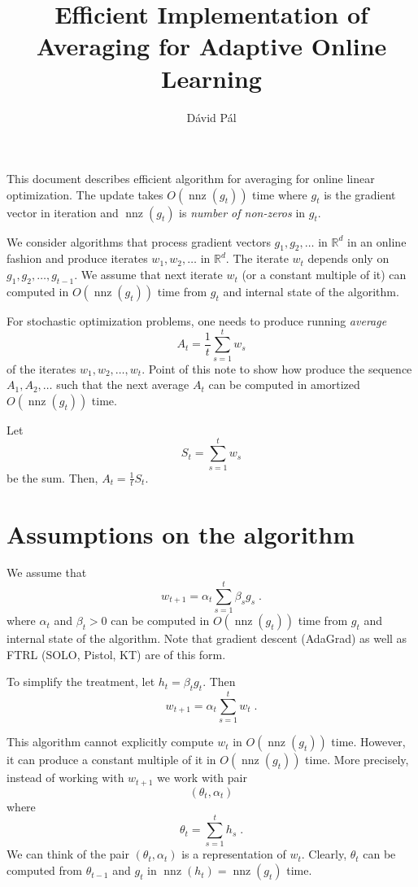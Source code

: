 \documentclass{article}
\newcommand{\R}{\mathbb{R}}
\DeclareMathOperator*{\nnz}{nnz}
\begin{document}
\title{Efficient Implementation of Averaging for Adaptive Online Learning}
\author{D\'avid P\'al}
\maketitle

This document describes efficient algorithm for averaging for online linear
optimization. The update takes $O(\nnz(g_t))$ time where $g_t$ is the gradient
vector in iteration and $\nnz(g_t)$ is \emph{number of non-zeros} in $g_t$.

We consider algorithms that process gradient vectors $g_1, g_2, \dots$ in
$\R^d$ in an online fashion and produce iterates $w_1, w_2, \dots$ in $\R^d$.
The iterate $w_t$ depends only on $g_1, g_2, \dots, g_{t-1}$.  We assume that
next iterate $w_t$ (or a constant multiple of it) can computed in
$O(\nnz(g_t))$ time from $g_t$ and internal state of the algorithm.

For stochastic optimization problems, one needs to produce running \emph{average}
$$
A_t = \frac{1}{t} \sum_{s=1}^t w_s
$$
of the iterates $w_1, w_2, \dots, w_t$. Point of this note to show
how produce the sequence $A_1, A_2, \dots$ such that the next average $A_t$
can be computed in amortized $O(\nnz(g_t))$ time.

Let
$$
S_t = \sum_{s=1}^t w_s
$$
be the sum. Then, $A_t = \frac{1}{t} S_t$.

\section{Assumptions on the algorithm}

We assume that
$$
w_{t+1} = \alpha_t \sum_{s=1}^t \beta_s g_s \; .
$$
where $\alpha_t$ and $\beta_t > 0$ can be computed in $O(\nnz(g_t))$ time
from $g_t$ and internal state of the algorithm.  Note that gradient descent
(AdaGrad) as well as FTRL (SOLO, Pistol, KT) are of this form.

To simplify the treatment, let $h_t = \beta_t g_t$. Then
$$
w_{t+1} = \alpha_t \sum_{s=1}^t w_t \; .
$$

This algorithm cannot explicitly compute $w_t$ in $O(\nnz(g_t))$ time.
However, it can produce a constant multiple of it in $O(\nnz(g_t))$ time.
More precisely, instead of working with $w_{t+1}$ we work with pair
$$
(\theta_t, \alpha_t)
$$
where
$$
\theta_t = \sum_{s=1}^t h_s \; .
$$
We can think of the pair $(\theta_t, \alpha_t)$ is a representation of $w_t$.
Clearly, $\theta_t$ can be computed from $\theta_{t-1}$ and $g_t$ in $\nnz(h_t)
= \nnz(g_t)$ time.
\end{document}
